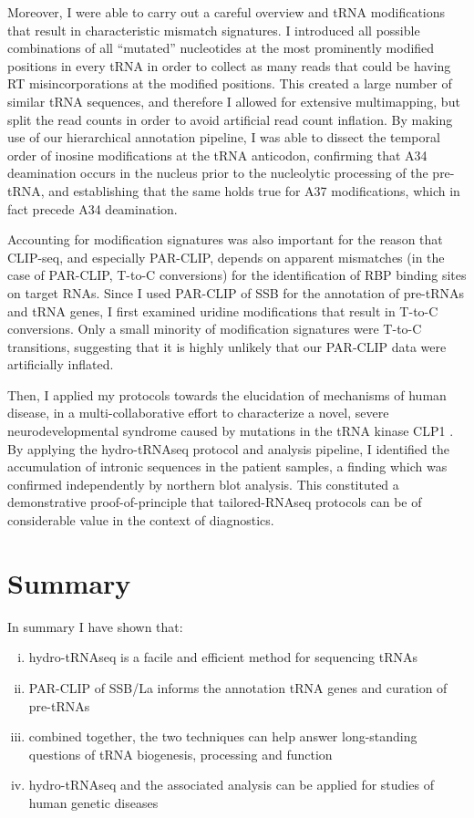 \documentclass[12pt]{rockefeller}
\begin{document}
Moreover, I were able to carry out a careful overview and tRNA modifications that result in characteristic mismatch signatures. I introduced all possible combinations of all “mutated” nucleotides at the most prominently modified positions in every tRNA in order to collect as many reads that could be having RT misincorporations at the modified positions. This created a large number of similar tRNA sequences, and therefore I allowed for extensive multimapping, but split the read counts in order to avoid artificial read count inflation. By making use of our hierarchical annotation pipeline, I was able to dissect the temporal order of inosine modifications at the tRNA anticodon, confirming that A34 deamination occurs in the nucleus prior to the nucleolytic processing of the pre-tRNA, and establishing that the same holds true for A37 modifications, which in fact precede A34 deamination. 

Accounting for modification signatures was also important for the reason that CLIP-seq, and especially PAR-CLIP, depends on apparent mismatches (in the case of PAR-CLIP, T-to-C conversions) for the identification of RBP binding sites on target RNAs. Since I used PAR-CLIP of SSB for the annotation of pre-tRNAs and tRNA genes, I first examined uridine modifications that result in T-to-C conversions. Only a small minority of modification signatures were T-to-C transitions, suggesting that it is highly unlikely that our PAR-CLIP data were artificially inflated. 

Then, I applied my protocols towards the elucidation of mechanisms of human disease, in a multi-collaborative effort to characterize a novel, severe neurodevelopmental syndrome caused by mutations in the tRNA kinase CLP1 \cite{Karaca:2014em}. By applying the hydro-tRNAseq protocol and analysis pipeline, I identified the accumulation of intronic sequences in the patient samples, a finding which was confirmed independently by northern blot analysis. This constituted a demonstrative proof-of-principle that tailored-RNAseq protocols can be of considerable value in the context of diagnostics. 

\section{Summary}
In summary I have shown that: 
\begin{enumerate}[i)]
\item hydro-tRNAseq is a facile and efficient method for sequencing tRNAs
\item PAR-CLIP of SSB/La informs the annotation tRNA genes and curation of pre-tRNAs
\item combined together, the two techniques can help answer long-standing questions of tRNA biogenesis, processing and function
\item hydro-tRNAseq and the associated analysis can be applied for studies of human genetic diseases
\end{enumerate}
\end{document}
